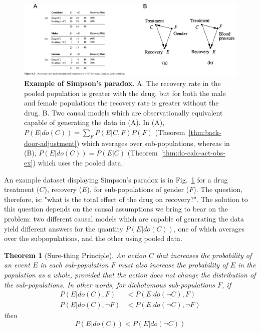 \documentclass[11pt]{article}
\numberwithin{equation}{section}
\newtheorem{thm}{Theorem}[section]
\begin{document}
\begin{figure}
\begin{center}
\includegraphics[width=0.8\columnwidth]{figures/simpson.png}  
\end{center}
\caption{\textbf{Example of Simpson's paradox}. A. The recovery rate in the pooled population is greater with the drug, but for both the male and female populations the recovery rate is greater without the drug. B. Two causal models which are observationally equivalent capable of generating the data in (A). In (A), $P(E|do(C)) = \sum_F P(E|C,F) P(F)$  (Theorem~\ref{thm:back-door-adjustment}) which averages over sub-populations, whereas in (B), $P(E|do(C)) = P(E|C)$ (Theorem~\ref{thm:do-calc-act-obs-ex}) which uses the pooled data.
}
\label{Fig:simpson}
\end{figure}

An example dataset displaying Simpson's paradox is in Fig.~\ref{Fig:simpson} for a drug treatment ($C$), recovery ($E$), for sub-populations of gender ($F$). The question, therefore, is: "what is the total effect of the drug on recovery?". The solution to this question depends on the causal assumptions we bring to bear on the problem: two different causal models which are capable of generating the data yield different answers for the quantity $P(E|do(C))$, one of which averages over the subpopulations, and the other using pooled data. 

\begin{thm}[Sure-thing Principle]
An action $C$ that increases the probability of an event $E$ in each sub-population $F$ must also increase the probability of $E$ in the population as a whole, provided that the action does not change the distribution of the sub-populations. In other words, for dichotomous sub-populations $F$, if  \label{thm:sure-thing}
\begin{align}
P(E|do(C), F) &< P(E|do(\neg C), F) \\
P(E|do(C), \neg F) &< P(E|do(\neg C), \neg F) \nonumber
\end{align}
then
\begin{equation}
P(E|do(C)) < P(E|do(\neg C))
\end{equation}
\end{thm}
\end{document}
